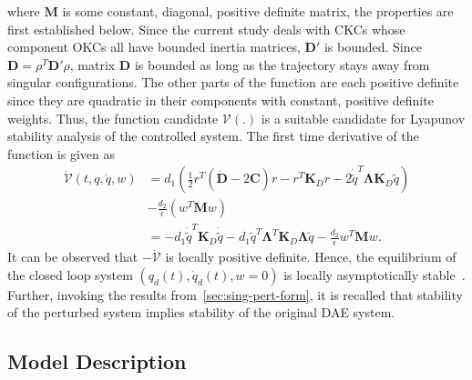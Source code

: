 \documentclass[10pt,final,journal,letterpaper,oneside,twocolumn]{IEEEtran}
\begin{document}
where $\bm{M}$ is some constant, diagonal, positive definite matrix,
the properties are first established below. Since the current study
deals with CKCs whose component OKCs all have bounded inertia
matrices, $\bm{D}'$ is bounded. Since $\bm{D} = \rho^T\bm{D}'\rho$,
matrix $\bm{D}$ is bounded as long as the trajectory stays away from
singular configurations. The other parts of the function are each
positive definite since they are quadratic in their components with
constant, positive definite weights. Thus, the function candidate
$\mathcal{V}(.)$ is a suitable candidate for Lyapunov stability
analysis of the controlled system. The first time derivative of the
function is given as
\begin{align}
  \dot{\mathcal{V}}(t, q, \dot{q}, w) &= d_1\left(\frac{1}{2}r^T
                                        (\dot{\bm{D}} - 2\bm{C})r
                                        -r^T\bm{K}_Dr
                                        -2\dot{\tilde{q}}^T
                                        \bm{\Lambda} \bm{K}_D\tilde{q}
                                        \right)\nonumber\\
                                      &- \frac{d_2}{\epsilon}\left(
                                        w^T\bm{M}w \right)\nonumber\\
  &= -d_1\dot{\tilde{q}}^T\bm{K}_D\dot{\tilde{q}} -d_1
    \tilde{q}^T\bm{\Lambda}^T \bm{K}_D \bm{\Lambda} \tilde{q} -
    \frac{d_2}{\epsilon} w^T \bm{M} w.
  \label{eq:lyapdot}
\end{align}
It can be observed that $-\dot{\mathcal{V}}$ is locally positive
definite. Hence, the equilibrium of the closed loop system $(q_d(t),
\dot{q}_d(t), w=0)$ is locally asymptotically
stable~\cite{vidyasagar1978nonlinear}. Further, invoking the results
from~\cref{sec:sing-pert-form}, it is recalled that stability of the
perturbed system implies stability of the original DAE system.

\subsection{Model Description}
\label{sec:model-description}
\end{document}
